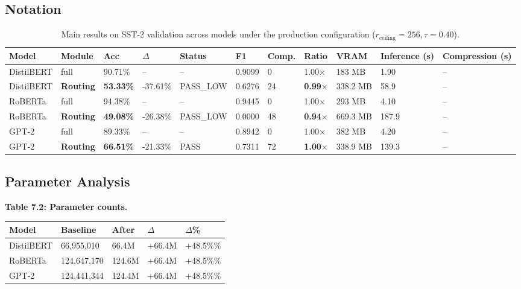 \subsection{Notation}

\begin{table}[t]
\centering
\small
\begin{tabular}{lllllllllll}
\toprule
\textbf{Model} & \textbf{Module} & \textbf{Acc} & \textbf{$\Delta$} & \textbf{Status} & \textbf{F1} & \textbf{Comp.} & \textbf{Ratio} & \textbf{VRAM} & \textbf{Inference (s)} & \textbf{Compression (s)} \\
\midrule
DistilBERT & full & 90.71\% & -- & -- & 0.9099 & 0 & 1.00$\times$ & 183 MB & 1.90 & -- \\
DistilBERT & \textbf{Routing} & \textbf{53.33\%} & -37.61\% & PASS_LOW & 0.6276 & 24 & \textbf{0.99$\times$} & 338.2 MB & 58.9 & -- \\
RoBERTa & full & 94.38\% & -- & -- & 0.9445 & 0 & 1.00$\times$ & 293 MB & 4.10 & -- \\
RoBERTa & \textbf{Routing} & \textbf{49.08\%} & -26.38\% & PASS_LOW & 0.0000 & 48 & \textbf{0.94$\times$} & 669.3 MB & 187.9 & -- \\
GPT-2 & full & 89.33\% & -- & -- & 0.8942 & 0 & 1.00$\times$ & 382 MB & 4.20 & -- \\
GPT-2 & \textbf{Routing} & \textbf{66.51\%} & -21.33\% & PASS & 0.7311 & 72 & \textbf{1.00$\times$} & 338.9 MB & 139.3 & -- \\
\bottomrule
\end{tabular}
\caption{Main results on SST-2 validation across models under the production configuration ($r_{\mathrm{ceiling}}=256, \tau=0.40$).}
\label{tab:main_sst2}
\end{table}

\subsection{Parameter Analysis}

\textbf{Table 7.2: Parameter counts.}

\begin{table}[H]
\centering
\small
\begin{tabular}{lllll}
\toprule
\textbf{Model} & \textbf{Baseline} & \textbf{After} & \textbf{$\Delta$} & \textbf{$\Delta$\%} \\
\midrule
DistilBERT & 66,955,010 & 66.4M & +66.4M & +48.5\%\% \\
RoBERTa & 124,647,170 & 124.6M & +66.4M & +48.5\%\% \\
GPT-2 & 124,441,344 & 124.4M & +66.4M & +48.5\%\% \\
\bottomrule
\end{tabular}
\end{table}

